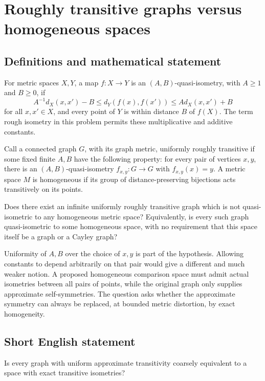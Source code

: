 \documentclass[11pt,a4paper]{article}
\begin{document}
\section*{Roughly transitive graphs versus homogeneous spaces}\label{statement}

\subsection{Definitions and mathematical statement}
For metric spaces $X,Y$, a map $f:X\to Y$ is an $(A,B)$-quasi-isometry, with $A\ge1$ and $B\ge0$, if
\[
A^{-1}d_X(x,x')-B\le d_Y(f(x),f(x'))\le A d_X(x,x')+B
\]
for all $x,x'\in X$, and every point of $Y$ is within distance $B$ of $f(X)$. The term rough isometry in this problem permits these multiplicative and additive constants.

Call a connected graph $G$, with its graph metric, uniformly roughly transitive if some fixed finite $A,B$ have the following property: for every pair of vertices $x,y$, there is an $(A,B)$-quasi-isometry $f_{x,y}:G\to G$ with $f_{x,y}(x)=y$. A metric space $M$ is homogeneous if its group of distance-preserving bijections acts transitively on its points.

Does there exist an infinite uniformly roughly transitive graph which is not quasi-isometric to any homogeneous metric space? Equivalently, is every such graph quasi-isometric to some homogeneous space, with no requirement that this space itself be a graph or a Cayley graph?

Uniformity of $A,B$ over the choice of $x,y$ is part of the hypothesis. Allowing constants to depend arbitrarily on that pair would give a different and much weaker notion. A proposed homogeneous comparison space must admit actual isometries between all pairs of points, while the original graph only supplies approximate self-symmetries. The question asks whether the approximate symmetry can always be replaced, at bounded metric distortion, by exact homogeneity.
\subsection{Short English statement}
Is every graph with uniform approximate transitivity coarsely equivalent to a space with exact transitive isometries?
\end{document}
